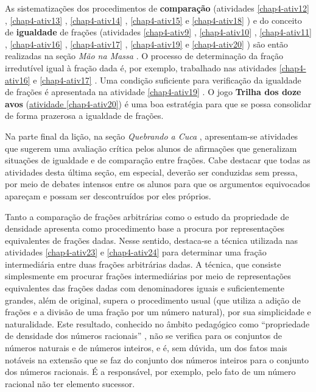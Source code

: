   As sistematizações dos procedimentos de   {\bfseries comparação}   (atividades \ref{chap4-ativ12}  ,
\ref{chap4-ativ13} , \ref{chap4-ativ14}  , \ref{chap4-ativ15}   e \ref{chap4-ativ18}  ) e do conceito de   {\bfseries igualdade}   de frações
(atividades \ref{chap4-ativ9}  , \ref{chap4-ativ10}  , \ref{chap4-ativ11}  , \ref{chap4-ativ16}  , \ref{chap4-ativ17}  , \ref{chap4-ativ19}   e \ref{chap4-ativ20}  ) são então realizadas na
seção   {\itshape Mão na Massa}  . O processo de determinação da fração irredutível
igual à fração dada é, por exemplo, trabalhado nas atividades \ref{chap4-ativ16}   e \ref{chap4-ativ17}  . Uma
condição suficiente para verificação da igualdade de frações é apresentada na
atividade \ref{chap4-ativ19}  . O jogo   {\bfseries Trilha dos doze avos}   (\hyperref[chap4-ativ20]{atividade \ref{chap4-ativ20}}) é
uma boa estratégia para que se possa consolidar de forma prazerosa a igualdade
de frações.

  Na parte final da lição, na seção   {\itshape Quebrando a Cuca}  , apresentam-se
atividades que sugerem uma avaliação crítica pelos alunos de afirmações que
generalizam situações de igualdade e de comparação entre frações. Cabe destacar
que todas as atividades desta última seção, em especial, deverão ser conduzidas
sem pressa, por meio de debates intensos entre os alunos para que os argumentos
equivocados apareçam e possam ser descontruídos por eles próprios.

  Tanto a comparação de frações arbitrárias como o estudo da propriedade de
densidade apresenta como procedimento base a procura por representações
equivalentes de frações dadas. Nesse sentido, destaca-se a técnica utilizada nas
atividades \ref{chap4-ativ23}   e \ref{chap4-ativ24}   para determinar uma fração intermediária entre duas
frações arbitrárias dadas. A técnica, que consiste simplesmente em procurar
frações intermediárias por meio de representações equivalentes das frações dadas
com denominadores iguais e suficientemente grandes, além de original, supera o
procedimento usual (que utiliza a adição de frações e a divisão de uma fração
por um número natural), por sua simplicidade e naturalidade. Este resultado,
conhecido no âmbito pedagógico como   ``propriedade de densidade dos números
racionais''  , não se verifica para os conjuntos de números naturais e de
números inteiros, e é, sem dúvida, um dos fatos mais notáveis na extensão que se
faz do conjunto dos números inteiros para o conjunto dos números racionais.  É a
responsável, por exemplo, pelo fato de um número racional não ter elemento
sucessor.

